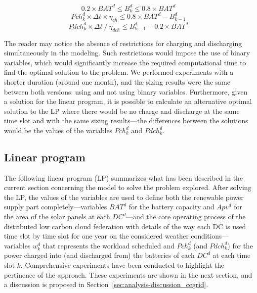 \begin{equation} \label{eq:batlimit}
0.2\times BAT^d\leq B_k^d\leq 0.8\times BAT^d
\end{equation}
\begin{equation} \label{eq:pchlimit}
Pch^d_k \times \Delta t \times \eta_{ch} \leq 0.8\times BAT^d - B^d_{k-1}
\end{equation}
\begin{equation} \label{eq:pdchlimit}
Pdch^d_k \times \Delta t\ / \ \eta_{dch} \leq B^d_{k-1} - 0.2\times BAT^d
\end{equation}


The reader may notice the absence of restrictions for charging and discharging simultaneously in the modeling. Such restrictions would impose the use of binary variables, which would significantly increase the required computational time to find the optimal solution to the problem. We performed experiments with a shorter duration (around one month), and the sizing results were the same between both versions: using and not using binary variables. Furthermore, given a solution for the linear program, it is possible to calculate an alternative optimal solution to the LP where there would be no charge and discharge at the same time slot and with the same sizing results---the differences between the solutions would be the values of the variables $Pch_k^d$ and $Pdch_k^d$.

\subsection{Linear program}

The following linear program (LP) summarizes what has been described in the current section concerning the model to solve the problem explored. After solving the LP, the values of the variables are used to define both the renewable power supply part completely---variables $BAT^d$ for the battery capacity and $Apv^d$ for the area of the solar panels at each $DC^d$---and the core operating process of the distributed low carbon cloud federation with details of the way each DC is used time slot by time slot for one year on the considered weather conditions---variables $ w_k^d$ that represents the workload scheduled and $Pch^d_k$ (and $Pdch^d_k$) for the power charged into (and discharged from) the batteries of each $DC^d$ at each time slot $k$. Comprehensive experiments have been conducted to highlight the pertinence of the approach. These experiments are shown in the next section, and a discussion is proposed in Section~\ref{sec:analysis-discussion_ccgrid}.

